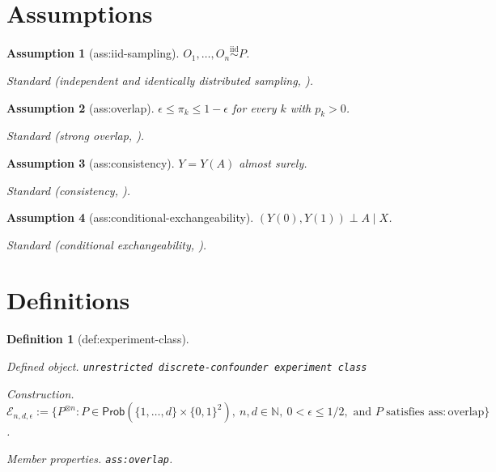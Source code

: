 \documentclass{article}
\newtheorem{assumption}{Assumption}
\newtheorem{definition}{Definition}
\begin{document}
\section{Assumptions}

\begin{assumption}[ass:iid-sampling]\label{ass:iid-sampling}
\(O_1,\ldots,O_n\stackrel{\mathrm{iid}}{\sim}P\).
\par\smallskip\noindent\emph{Standard} (independent and identically distributed sampling, \cite{ZengBalakrishnanHanKennedy2024}).
\end{assumption}

\begin{assumption}[ass:overlap]\label{ass:overlap}
\(\epsilon\le\pi_k\le1-\epsilon\) for every \(k\) with \(p_k>0\).
\par\smallskip\noindent\emph{Standard} (strong overlap, \cite{ZengBalakrishnanHanKennedy2024}).
\end{assumption}

\begin{assumption}[ass:consistency]\label{ass:consistency}
\(Y=Y(A)\) almost surely.
\par\smallskip\noindent\emph{Standard} (consistency, \cite{ZengBalakrishnanHanKennedy2024}).
\end{assumption}

\begin{assumption}[ass:conditional-exchangeability]\label{ass:conditional-exchangeability}
\((Y(0),Y(1))\perp A\mid X\).
\par\smallskip\noindent\emph{Standard} (conditional exchangeability, \cite{ZengBalakrishnanHanKennedy2024}).
\end{assumption}

\section{Definitions}

\begin{definition}[def:experiment-class]\label{def:experiment-class}
\par\smallskip\noindent\emph{Defined object.} \texttt{unrestricted discrete-confounder experiment class}
\par\smallskip\noindent\emph{Construction.} \(\mathcal E_{n,d,\epsilon}:=\{P^{\otimes n}: P\in\mathsf{Prob}(\{1,\ldots,d\}\times\{0,1\}^2),\ n,d\in\mathbb N,\ 0<\epsilon\le1/2,\text{ and }P\text{ satisfies }\mathrm{ass:overlap}\}\).
\par\smallskip\noindent\emph{Member properties.} \texttt{ass:overlap}.
\end{definition}
\end{document}
